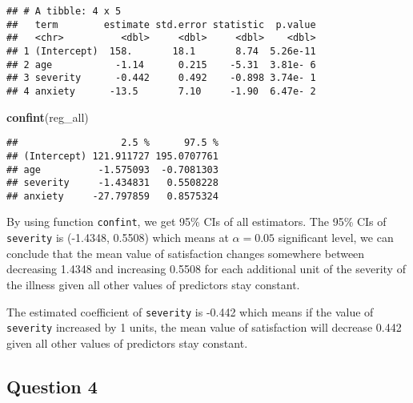 \documentclass[]{article}
\newenvironment{Shaded}{\begin{snugshade}}{\end{snugshade}}
\newcommand{\KeywordTok}[1]{\textcolor[rgb]{0.13,0.29,0.53}{\textbf{#1}}}
\newcommand{\DataTypeTok}[1]{\textcolor[rgb]{0.13,0.29,0.53}{#1}}
\newcommand{\DecValTok}[1]{\textcolor[rgb]{0.00,0.00,0.81}{#1}}
\newcommand{\FloatTok}[1]{\textcolor[rgb]{0.00,0.00,0.81}{#1}}
\newcommand{\StringTok}[1]{\textcolor[rgb]{0.31,0.60,0.02}{#1}}
\newcommand{\OperatorTok}[1]{\textcolor[rgb]{0.81,0.36,0.00}{\textbf{#1}}}
\newcommand{\NormalTok}[1]{#1}
\begin{document}
\begin{verbatim}
## # A tibble: 4 x 5
##   term        estimate std.error statistic  p.value
##   <chr>          <dbl>     <dbl>     <dbl>    <dbl>
## 1 (Intercept)  158.       18.1       8.74  5.26e-11
## 2 age           -1.14      0.215    -5.31  3.81e- 6
## 3 severity      -0.442     0.492    -0.898 3.74e- 1
## 4 anxiety      -13.5       7.10     -1.90  6.47e- 2
\end{verbatim}

\begin{Shaded}
\begin{Highlighting}[]
\KeywordTok{confint}\NormalTok{(reg_all)}
\end{Highlighting}
\end{Shaded}

\begin{verbatim}
##                  2.5 %      97.5 %
## (Intercept) 121.911727 195.0707761
## age          -1.575093  -0.7081303
## severity     -1.434831   0.5508228
## anxiety     -27.797859   0.8575324
\end{verbatim}

By using function \texttt{confint}, we get 95\% CIs of all estimators.
The 95\% CIs of \texttt{severity} is (-1.4348, 0.5508) which means at
\(\alpha = 0.05\) significant level, we can conclude that the mean value
of satisfaction changes somewhere between decreasing 1.4348 and
increasing 0.5508 for each additional unit of the severity of the
illness given all other values of predictors stay constant.

The estimated coefficient of \texttt{severity} is -0.442 which means if
the value of \texttt{severity} increased by 1 units, the mean value of
satisfaction will decrease 0.442 given all other values of predictors
stay constant.

\subsection{Question 4}\label{question-4-1}

\begin{Shaded}
\end{Shaded}
\end{document}
